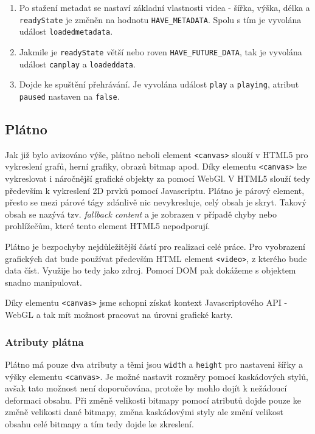 \begin{description}
\begin{enumerate}
			\item Po stažení metadat se nastaví základní vlastnosti videa - šířka, výška, délka a \texttt{readyState} je změněn na hodnotu \texttt{HAVE\_METADATA}. Spolu s tím je vyvolána událost \texttt{loadedmetadata}.
			
			\item Jakmile je \texttt{readyState} větší nebo roven \texttt{HAVE\_FUTURE\_DATA}, tak je vyvolána událost \texttt{canplay} a \texttt{loadeddata}.
			
			\item Dojde ke spuštění přehrávání. Je vyvolána událost \texttt{play} a \texttt{playing}, atribut \texttt{paused} nastaven na \texttt{false}.
		\end{enumerate}
\end{description}


\newpage

\subsection{Plátno}

Jak již bylo avizováno výše, plátno neboli element \texttt{<canvas>} slouží v HTML5 pro vykreslení grafů, herní grafiky, obrazů bitmap apod. Díky elementu \texttt{<canvas>} lze vykreslovat i náročnější grafické objekty za pomocí WebGl. V HTML5 slouží tedy především k vykreslení 2D prvků pomocí Javascriptu. Plátno je párový  element, přesto se mezi párové tágy zdánlivě nic nevykresluje, celý obsah je skryt. Takový obsah se nazývá tzv. \textit{fallback content} a je zobrazen v případě chyby nebo prohlížečům, které tento element HTML5 nepodporují.

Plátno je bezpochyby nejdůležitější částí pro realizaci celé práce. Pro  vyobrazení grafických dat bude používat především HTML element \texttt{<video>}, z kterého bude data číst. Využije ho tedy jako zdroj. Pomocí DOM pak dokážeme s objektem snadno manipulovat. 

Díky elementu \texttt{<canvas>} jsme schopni získat kontext Javascriptového API - WebGL a tak mít možnost  pracovat na úrovni grafické karty.


\subsubsection*{Atributy plátna}
Plátno má pouze dva atributy a těmi jsou \texttt{width} a \texttt{height} pro nastaveni šířky a výšky elementu \texttt{<canvas>}. Je možné nastavit rozměry pomocí kaskádových stylů, avšak tato možnost není doporučována, protože by mohlo dojít k nežádoucí deformaci obsahu. Při změně velikosti bitmapy pomocí atributů dojde pouze ke změně velikosti dané bitmapy, změna kaskádovými styly ale změní velikost obsahu celé bitmapy a tím tedy dojde ke zkreslení.


